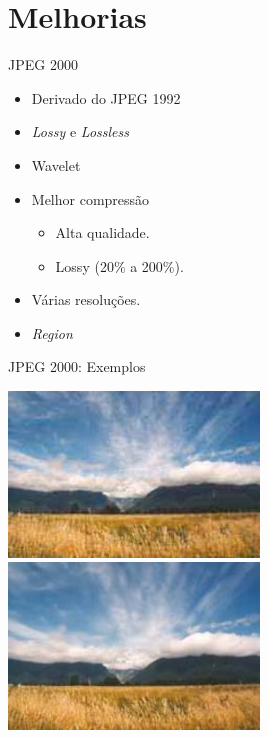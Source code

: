\documentclass{beamer}
\begin{document}
\section{Melhorias}
\begin{frame}{JPEG 2000}
\begin{itemize}
   \item Derivado do JPEG 1992
   \item \emph{Lossy} e \emph{Lossless}
   \item Wavelet
   \item Melhor compressão
      \begin{itemize}
         \item Alta qualidade.
         \item Lossy (20\% a 200\%).
      \end{itemize}
   \item Várias resoluções.
   \item \emph{Region }
\end{itemize}
\end{frame}
\begin{frame}{JPEG 2000: Exemplos}
   \begin{multicols}{2}
   \includegraphics[width=0.5\textwidth]{figure/ex_jpeg_01.jpg}
   \includegraphics[width=0.5\textwidth]{figure/ex_jpeg2k_01_2.jpg}
   \end{multicols}
\end{frame}
\end{document}
